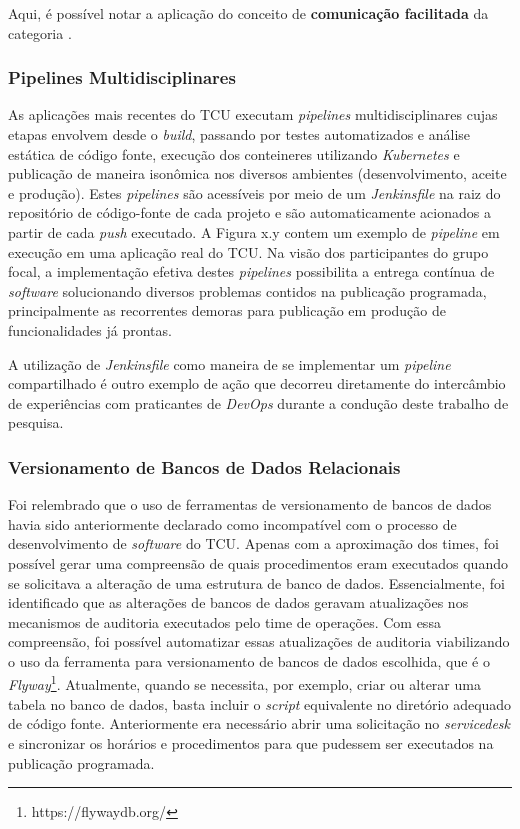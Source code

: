 Aqui, é possível notar a aplicação do conceito de {\bf comunicação facilitada}
da categoria .

\subsubsection{Pipelines Multidisciplinares}

As aplicações mais recentes do \acrshort{TCU} executam {\it pipelines}
multidisciplinares cujas etapas envolvem desde o {\it build}, passando por testes
automatizados e análise estática de código fonte, execução dos conteineres
utilizando {\it Kubernetes} e publicação de maneira isonômica nos diversos
ambientes (desenvolvimento, aceite e produção). Estes {\it pipelines} são
acessíveis por meio de um {\it Jenkinsfile} na raiz do repositório de código-fonte
de cada projeto e são automaticamente acionados a partir de cada {\it push}
executado. A Figura x.y contem um exemplo de {\it pipeline} em execução em uma
aplicação real do \acrshort{TCU}. Na visão dos participantes do grupo focal,
a implementação efetiva destes {\it pipelines} possibilita a entrega contínua
de {\it software} solucionando diversos problemas contidos na publicação
programada, principalmente as recorrentes demoras para publicação em produção
de funcionalidades já prontas.

A utilização de {\it Jenkinsfile} como maneira de se implementar um {\it pipeline}
compartilhado é outro exemplo de ação  que decorreu diretamente do intercâmbio
de experiências com praticantes de {\it DevOps} durante a condução deste
trabalho de pesquisa.

\subsubsection{Versionamento de Bancos de Dados Relacionais}

Foi relembrado que o uso de ferramentas de versionamento de bancos de dados
havia sido anteriormente declarado como incompatível com o processo de
desenvolvimento de {\it software} do \acrshort{TCU}. Apenas com a aproximação
dos times, foi possível gerar uma compreensão de quais procedimentos eram
executados quando se solicitava a alteração de uma estrutura de banco de dados.
Essencialmente, foi identificado que as alterações de bancos de dados geravam
atualizações nos mecanismos de auditoria executados pelo time de operações. Com
essa compreensão, foi possível automatizar essas atualizações de auditoria viabilizando o uso
da ferramenta para versionamento de bancos de dados escolhida, que é o {\it Flyway}\footnote{https://flywaydb.org/}.
Atualmente, quando se necessita, por exemplo, criar ou alterar uma tabela no
banco de dados, basta incluir o {\it script} equivalente no diretório adequado
de código fonte. Anteriormente era necessário abrir uma solicitação no {\it servicedesk}
e sincronizar os horários e procedimentos para que pudessem ser executados na
publicação programada.


